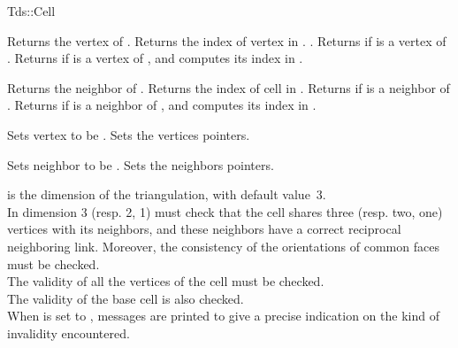 \begin{ccClass}{Tds::Cell}
\ccAccessFunctions

{Returns the vertex  of \ccVar.
}
\ccGlue
{}
{Returns the index of vertex  in \ccVar.
.}
\ccGlue
{}
{Returns  if   is a vertex of \ccVar.}
\ccGlue
{}
{Returns  if  is a vertex of \ccVar, and
computes its index  in \ccVar.}

{Returns  the neighbor  of \ccVar.
}
\ccGlue
{}
{Returns the index of cell  in \ccVar.
}
\ccGlue
{}
{Returns  if  is a neighbor of \ccVar.}
\ccGlue
{}
{Returns  if  is a neighbor of \ccVar,  and
computes its index  in \ccVar.}


{Sets vertex  to be .
}
\ccGlue
{}
{Sets the vertices pointers.}

{Sets neighbor  to be .
}
\ccGlue
{}
{Sets the neighbors pointers.}

{ is the dimension of the triangulation, with default
value~3.\\
In dimension 3 (resp. 2, 1) must check that the cell shares three
(resp. two, one) vertices with its neighbors, and these neighbors have
a correct reciprocal neighboring link. Moreover, the consistency of
the orientations of common faces must be checked.\\
The validity of all the vertices of the cell must be checked.\\
The validity of the base cell is also checked.\\ 
When  is set to , messages are printed to give
a precise indication on the kind of invalidity encountered.}

	\end{ccClass} 

